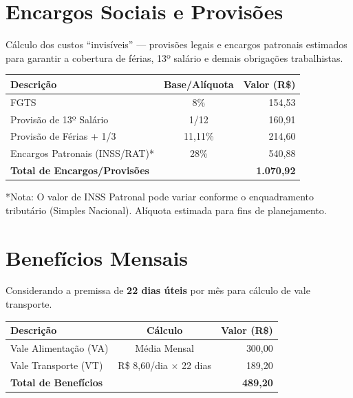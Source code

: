 \documentclass[12pt, a4paper]{article}
\begin{document}
\section{Encargos Sociais e Provisões}

Cálculo dos custos ``invisíveis'' --- provisões legais e encargos patronais estimados para garantir a cobertura de férias, 13º salário e demais obrigações trabalhistas.

\begin{table}[H]
    \centering
    \renewcommand{\arraystretch}{1.5}
    \begin{tabularx}{\textwidth}{X c r}
        \toprule
        \rowcolor{tableHeader} \textbf{Descrição} & \textbf{Base/Alíquota} & \textbf{Valor (R\$)} \\
        \midrule
        FGTS & 8\% & 154,53 \\
        \rowcolor{lightGray}
        Provisão de 13º Salário & 1/12 & 160,91 \\
        Provisão de Férias + 1/3 & 11,11\% & 214,60 \\
        \rowcolor{lightGray}
        Encargos Patronais (INSS/RAT)* & 28\% & 540,88 \\
        \midrule
        \rowcolor{accentColor!10} \textbf{Total de Encargos/Provisões} & & \textbf{1.070,92} \\
        \bottomrule
    \end{tabularx}
\end{table}

\textcolor{secondaryText}{\footnotesize{*Nota: O valor de INSS Patronal pode variar conforme o enquadramento tributário (Simples Nacional). Alíquota estimada para fins de planejamento.}}

\section{Benefícios Mensais}

Considerando a premissa de \textbf{22 dias úteis} por mês para cálculo de vale transporte.

\begin{table}[H]
    \centering
    \renewcommand{\arraystretch}{1.5}
    \begin{tabularx}{\textwidth}{X c r}
        \toprule
        \rowcolor{tableHeader} \textbf{Descrição} & \textbf{Cálculo} & \textbf{Valor (R\$)} \\
        \midrule
        Vale Alimentação (VA) & Média Mensal & 300,00 \\
        \rowcolor{lightGray}
        Vale Transporte (VT) & R\$ 8,60/dia $\times$ 22 dias & 189,20 \\
        \midrule
        \rowcolor{accentColor!10} \textbf{Total de Benefícios} & & \textbf{489,20} \\
        \bottomrule
    \end{tabularx}
\end{table}
\end{document}
